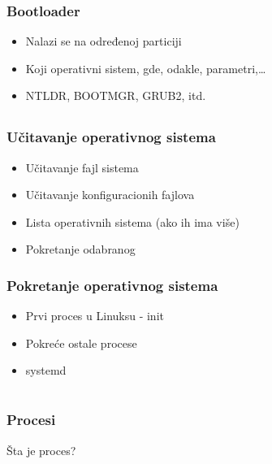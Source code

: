 \documentclass{beamer}
\begin{document}
\begin{frame}
    \frametitle{Bootloader}
    \begin{itemize}
        \item Nalazi se na određenoj particiji \newline
        \item Koji operativni sistem, gde, odakle, parametri,\dots \newline
        \item NTLDR, BOOTMGR, GRUB2, itd.
    \end{itemize}
\end{frame}
\subsection*{}
\begin{frame}
    \frametitle{Učitavanje operativnog sistema}
    \begin{itemize}
        \item Učitavanje fajl sistema \newline
        \item Učitavanje konfiguracionih fajlova \newline
        \item Lista operativnih sistema (ako ih ima više) \newline
        \item Pokretanje odabranog
    \end{itemize}
\end{frame}

\begin{frame}
    \frametitle{Pokretanje operativnog sistema}
    \begin{itemize}
        \item Prvi proces u Linuksu - init \newline
        \item Pokreće ostale procese \newline
        \item systemd \newline
    \end{itemize}
\end{frame}

\section*{}
\begin{frame}
    \frametitle{Procesi}
    \begin{center}
        \large{Šta je proces?}
    \end{center}
\end{frame}
\end{document}
